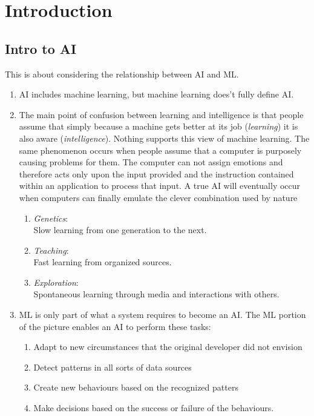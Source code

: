 \chapter{Introduction}

\section{Intro to AI}
This is about considering the relationship between AI and ML.
\begin{enumerate}
	\item AI includes machine learning, but machine learning does't fully define AI. 
	\item The main point of confusion between learning and intelligence is that people assume that simply because a machine gets better at its job (\emph{learning}) it is also aware (\emph{intelligence}). Nothing supports this view of machine learning. The same phenomenon occurs when people assume that a computer is purposely causing problems for them. The computer can not assign emotions and therefore acts only upon the input provided and the instruction contained within an application to process that input. A true AI will eventually occur when computers can finally emulate the clever combination used by nature
	\begin{enumerate}
		\item \emph{Genetics}:\\
		Slow learning from one generation to the next.
		\item \emph{Teaching}:\\
		Fast learning from organized sources.
		\item \emph{Exploration}:\\
		Spontaneous learning through media and interactions with others.
	\end{enumerate}
	\item ML is only part of what a system requires to become an AI. The ML portion of the picture enables an AI to perform these tasks:
	\begin{enumerate}
		\item Adapt to new circumstances that the original developer did not envision
		\item Detect patterns in all sorts of data sources
		\item Create new behaviours based on the recognized patters
		\item Make decisions based on the success or failure of the behaviours.
	\end{enumerate}

\end{enumerate}
